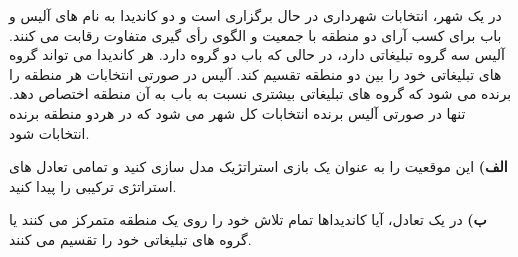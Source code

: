 در یک شهر، انتخابات شهرداری در حال برگزاری است و دو کاندیدا به نام های آلیس و باب برای کسب آرای دو منطقه با جمعیت و الگوی رأی گیری متفاوت رقابت می کنند. آلیس سه گروه تبلیغاتی دارد، در حالی که باب دو گروه دارد. هر کاندیدا می تواند گروه های تبلیغاتی خود را بین دو منطقه تقسیم کند. آلیس در صورتی انتخابات هر منطقه را برنده می شود که گروه های تبلیغاتی بیشتری نسبت به باب به آن منطقه اختصاص دهد. تنها در صورتی آلیس برنده انتخابات کل شهر می شود که در هردو منطقه برنده انتخابات شود.
\vspace{10pt}

\textbf{الف)}
این موقعیت را به عنوان یک بازی استراتژیک مدل سازی کنید و تمامی تعادل های استراتژی ترکیبی را پیدا کنید.
\vspace{5pt}

\textbf{ب)}
در یک تعادل، آیا کاندیداها تمام تلاش خود را روی یک منطقه متمرکز می کنند یا گروه های تبلیغاتی خود را تقسیم می کنند.